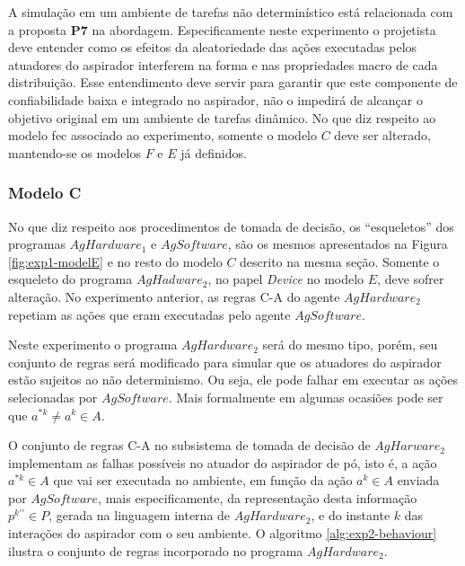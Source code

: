A simulação em um ambiente de tarefas não determinístico está relacionada com a proposta \textbf{P7} na abordagem. Especificamente neste experimento o projetista deve entender como os efeitos da aleatoriedade das ações executadas pelos atuadores do aspirador interferem na forma e nas propriedades macro de cada distribuição. Esse entendimento deve servir para garantir que este componente de confiabilidade baixa e integrado no aspirador, não o impedirá de alcançar o objetivo original em um ambiente de tarefas dinâmico. No que diz respeito ao modelo \acrshort{fec} associado ao experimento, somente o modelo $C$ deve ser alterado, mantendo-se os modelos $F$ e $E$ já definidos.

\subsubsection{Modelo C}

No que diz respeito aos procedimentos de tomada de decisão, os “esqueletos” dos programas $AgHardware_1$ e $AgSoftware$, são os mesmos apresentados na Figura \ref{fig:exp1-modelE}  e no resto do modelo $C$ descrito na mesma seção. Somente o esqueleto do programa $AgHadware_2$, no papel \textit{Device} no modelo $E$, deve sofrer alteração. No experimento anterior, as regras C-A do agente $AgHardware_2$ repetiam as ações que eram executadas pelo agente $AgSoftware$.

Neste experimento o programa $AgHardware_2$ será do mesmo tipo, porém, seu conjunto de regras será modificado para simular que os atuadores do aspirador estão sujeitos ao não determinismo. Ou seja, ele pode falhar em executar as ações selecionadas por $AgSoftware$. Mais formalmente em algumas ocasiões pode ser que $a^{*k} \neq a^k \in A$. 

O conjunto de regras C-A no subsistema de tomada de decisão de $AgHarware_2$ implementam as falhas possíveis no atuador do aspirador de pó, isto é, a ação $a^{*k} \in A$ que vai ser executada no ambiente, em função da ação $a^k \in A$ enviada por $AgSoftware$, mais especificamente, da representação desta informação $p^{k\prime\prime} \in P$, gerada na linguagem interna de $AgHardware_2$, e do instante $k$ das interações do aspirador com o seu ambiente. O algoritmo \ref{alg:exp2-behaviour} ilustra o conjunto de regras incorporado no programa $AgHardware_2$.


